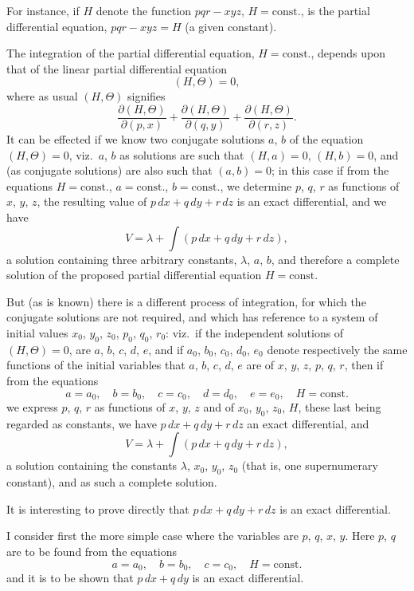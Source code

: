 \documentclass[11pt,a4paper]{article}
\theoremstyle{plain}
\theoremstyle{definition}
\begin{document}
For instance, if $H$ denote the function $pqr - xyz$, $H = \text{const.}$, is the partial differential equation, $pqr - xyz = H$ (a given constant).

The integration of the partial differential equation, $H = \text{const.}$, depends upon that of the linear partial differential equation
\[
(H, \Theta) = 0,
\]
where as usual $(H, \Theta)$ signifies
\[
\frac{\partial(H, \Theta)}{\partial(p, x)} + \frac{\partial(H, \Theta)}{\partial(q, y)} + \frac{\partial(H, \Theta)}{\partial(r, z)}.
\]
It can be effected if we know two conjugate solutions $a$, $b$ of the equation $(H, \Theta) = 0$, viz.~$a$, $b$ as solutions are such that $(H, a) = 0$, $(H, b) = 0$, and (as conjugate solutions) are also such that $(a, b) = 0$; in this case if from the equations $H = \text{const.}$, $a = \text{const.}$, $b = \text{const.}$, we determine $p$, $q$, $r$ as functions of $x$, $y$, $z$, the resulting value of $p\,dx + q\,dy + r\,dz$ is an exact differential, and we have
\[
V = \lambda + \int(p\,dx + q\,dy + r\,dz),
\]
a solution containing three arbitrary constants, $\lambda$, $a$, $b$, and therefore a complete solution of the proposed partial differential equation $H = \text{const.}$

But (as is known) there is a different process of integration, for which the conjugate solutions are not required, and which has reference to a system of initial values $x_0$, $y_0$, $z_0$, $p_0$, $q_0$, $r_0$: viz.~if the independent solutions of $(H, \Theta) = 0$, are $a$, $b$, $c$, $d$, $e$, and if $a_0$, $b_0$, $c_0$, $d_0$, $e_0$ denote respectively the same functions of the initial variables that $a$, $b$, $c$, $d$, $e$ are of $x$, $y$, $z$, $p$, $q$, $r$, then if from the equations
\[
a = a_0, \quad b = b_0, \quad c = c_0, \quad d = d_0, \quad e = e_0, \quad H = \text{const.}
\]
we express $p$, $q$, $r$ as functions of $x$, $y$, $z$ and of $x_0$, $y_0$, $z_0$, $H$, these last being regarded as constants, we have $p\,dx + q\,dy + r\,dz$ an exact differential, and
\[
V = \lambda + \int(p\,dx + q\,dy + r\,dz),
\]
a solution containing the constants $\lambda$, $x_0$, $y_0$, $z_0$ (that is, one supernumerary constant), and as such a complete solution.

It is interesting to prove directly that $p\,dx + q\,dy + r\,dz$ is an exact differential.

I consider first the more simple case where the variables are $p$, $q$, $x$, $y$. Here $p$, $q$ are to be found from the equations
\[
a = a_0, \quad b = b_0, \quad c = c_0, \quad H = \text{const.}
\]
and it is to be shown that $p\,dx + q\,dy$ is an exact differential.
\end{document}
